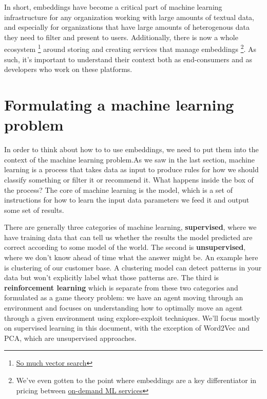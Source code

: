 \documentclass[draft, 11pt]{diazessay} %
\begin{document}
In short, embeddings have become a critical part of machine learning infrastructure for any organization working with large amounts of textual data, and especially for organizations that have large amounts of heterogenous data they need to filter and present to users.  Additionally, there is now a whole ecosystem \footnote{\href{https://github.com/currentslab/awesome-vector-search}{So much vector search}} around storing and creating services that manage embeddings \footnote{We've even gotten to the point where embeddings are a key differentiator in pricing between \href{https://openai.com/pricing}{on-demand ML services}}. As such, it's important to understand their context both as end-consumers and as developers who work on these platforms.

\section{Formulating a machine learning problem}

In order to think about how to to use embeddings, we need to put them into the context of the machine learning problem.As we saw in the last section, machine learning is a process that takes data as input to produce rules for how we should classify something or filter it or recommend it. What happens inside the box of the process? The core of machine learning is the model, which is a set of instructions for how to learn the input data parameters we feed it and output some set of results.

There are generally three categories of machine learning, \textbf{supervised}, where we have training data that can tell us whether the results the model predicted are correct according to some model of the world. The second is \textbf{unsupervised}, where we don't know ahead of time what the answer might be. An example here is clustering of our customer base. A clustering model can detect patterns in your data but won't explicitly label what those patterns are. The third is \textbf{reinforcement learning}  which is separate from these two categories and formulated as a game theory problem: we have an agent moving through an environment and focuses on understanding how to optimally move an agent through a given environment using explore-exploit techniques. We'll focus mostly on supervised learning in this document, with the exception of Word2Vec and PCA, which are unsupervised approaches. 
 
\end{document}
